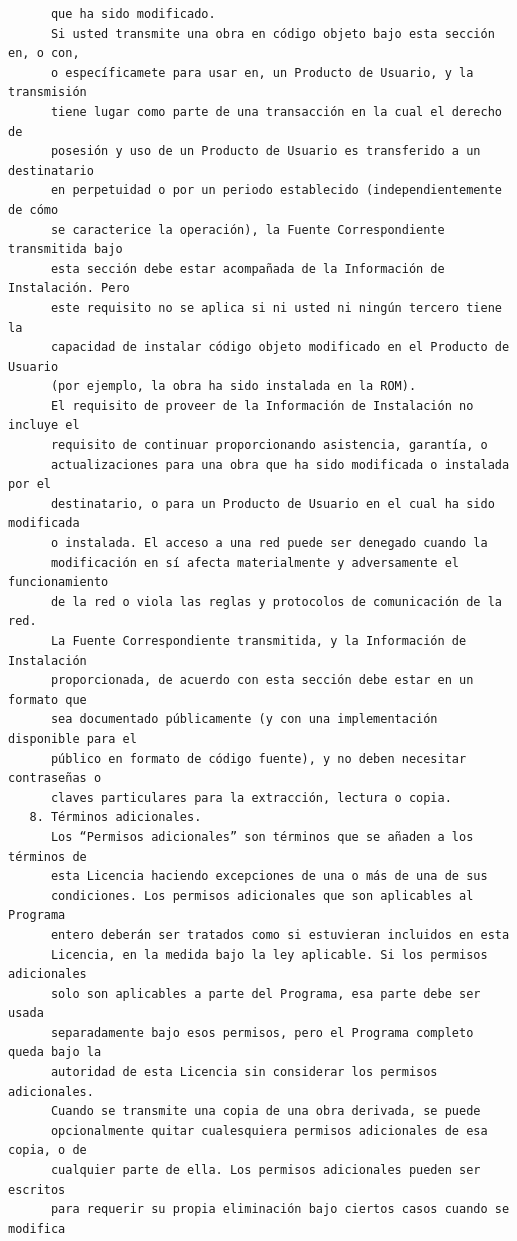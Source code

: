 \begin{verbatim}
      que ha sido modificado.
      Si usted transmite una obra en código objeto bajo esta sección en, o con,
      o específicamete para usar en, un Producto de Usuario, y la transmisión
      tiene lugar como parte de una transacción en la cual el derecho de
      posesión y uso de un Producto de Usuario es transferido a un destinatario
      en perpetuidad o por un periodo establecido (independientemente de cómo
      se caracterice la operación), la Fuente Correspondiente transmitida bajo
      esta sección debe estar acompañada de la Información de Instalación. Pero
      este requisito no se aplica si ni usted ni ningún tercero tiene la
      capacidad de instalar código objeto modificado en el Producto de Usuario
      (por ejemplo, la obra ha sido instalada en la ROM).
      El requisito de proveer de la Información de Instalación no incluye el
      requisito de continuar proporcionando asistencia, garantía, o
      actualizaciones para una obra que ha sido modificada o instalada por el
      destinatario, o para un Producto de Usuario en el cual ha sido modificada
      o instalada. El acceso a una red puede ser denegado cuando la
      modificación en sí afecta materialmente y adversamente el funcionamiento
      de la red o viola las reglas y protocolos de comunicación de la red.
      La Fuente Correspondiente transmitida, y la Información de Instalación
      proporcionada, de acuerdo con esta sección debe estar en un formato que
      sea documentado públicamente (y con una implementación disponible para el
      público en formato de código fuente), y no deben necesitar contraseñas o
      claves particulares para la extracción, lectura o copia.
   8. Términos adicionales.
      Los “Permisos adicionales” son términos que se añaden a los términos de
      esta Licencia haciendo excepciones de una o más de una de sus
      condiciones. Los permisos adicionales que son aplicables al Programa
      entero deberán ser tratados como si estuvieran incluidos en esta
      Licencia, en la medida bajo la ley aplicable. Si los permisos adicionales
      solo son aplicables a parte del Programa, esa parte debe ser usada
      separadamente bajo esos permisos, pero el Programa completo queda bajo la
      autoridad de esta Licencia sin considerar los permisos adicionales.
      Cuando se transmite una copia de una obra derivada, se puede
      opcionalmente quitar cualesquiera permisos adicionales de esa copia, o de
      cualquier parte de ella. Los permisos adicionales pueden ser escritos
      para requerir su propia eliminación bajo ciertos casos cuando se modifica

\end{verbatim}
